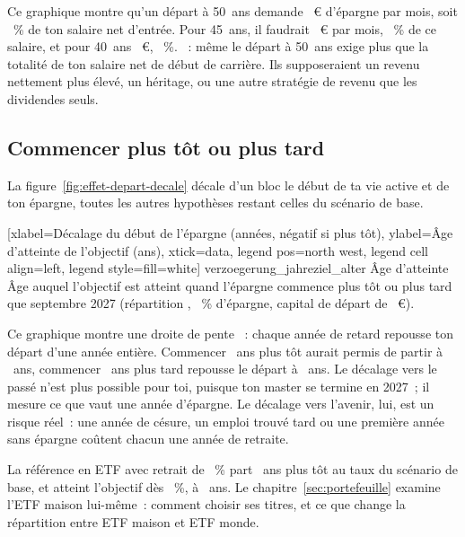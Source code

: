 Ce graphique montre qu'un d\'epart \`a 50~ans demande \SparbedarfCinquante~€ d'\'epargne par mois, soit
\SparbedarfCinquantePartNet~\% de ton salaire net d'entr\'ee. Pour 45~ans, il faudrait
\SparbedarfQuaranteCinq~€ par mois, \SparbedarfQuaranteCinqPartNet~\% de ce salaire, et pour 40~ans
\SparbedarfQuarante~€, \SparbedarfQuarantePartNet~\%. ~: m\^eme le d\'epart \`a 50~ans exige plus que la totalit\'e de ton
salaire net de d\'ebut de carri\`ere. Ils supposeraient un revenu nettement plus \'elev\'e, un
h\'eritage, ou une autre strat\'egie de revenu que les dividendes seuls.

\subsection{Commencer plus t\^ot ou plus tard}\label{sec:accu-retard}

La figure~\ref{fig:effet-depart-decale} d\'ecale d'un bloc le d\'ebut de ta vie active et de ton
\'epargne, toutes les autres hypoth\`eses restant celles du sc\'enario de base.

[xlabel={D\'ecalage du d\'ebut de l'\'epargne (ann\'ees, n\'egatif
  si plus t\^ot)}, ylabel={\^Age d'atteinte de l'objectif (ans)}, xtick=data, legend pos=north west, legend cell align=left, legend style={fill=white}]%
  {verzoegerung_jahre}{ziel_alter}%
  {{\^Age d'atteinte}}%
  {\^Age auquel l'objectif est atteint quand l'\'epargne commence plus t\^ot ou plus tard que
  septembre 2027 (r\'epartition \ReferenzStrategie, \ReferenzSparquote~\% d'\'epargne, capital de
  d\'epart de \KapitalDepartMitte~€).\label{fig:effet-depart-decale}}

Ce graphique montre une droite de pente \VerzoegerungPente~: chaque ann\'ee de retard repousse ton
d\'epart d'une ann\'ee enti\`ere. Commencer \VerzoegerungAnsAvance~ans plus t\^ot aurait permis de
partir \`a \VerzoegerungAlterAvance~ans, commencer \VerzoegerungAnsRetard~ans plus tard repousse le
d\'epart \`a \VerzoegerungAlterRetard~ans. Le d\'ecalage vers le pass\'e n'est plus possible pour toi,
puisque ton master se termine en 2027~; il mesure ce que vaut une ann\'ee d'\'epargne. Le d\'ecalage
vers l'avenir, lui, est un risque r\'eel~: une ann\'ee de c\'esure, un emploi trouv\'e tard ou une
premi\`ere ann\'ee sans \'epargne co\^utent chacun une ann\'ee de retraite.

 La r\'ef\'erence en ETF avec retrait de \TauxRetrait~\% part \EcartAgeEtfMaisonBasis~ans plus
t\^ot au taux du sc\'enario de base, et atteint l'objectif d\`es \SparquoteZwanzig~\%, \`a
\AlterEtfReferenzZwanzig~ans. Le chapitre~\ref{sec:portefeuille} examine l'ETF maison lui-m\^eme~: comment choisir ses
titres, et ce que change la r\'epartition entre ETF maison et ETF monde.


